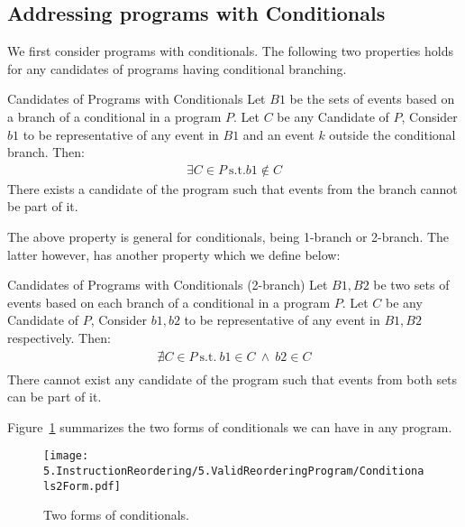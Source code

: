 \subsection{Addressing programs with Conditionals}

        We first consider programs with conditionals. 
        The following two properties holds for any candidates of programs having conditional branching. 
        \begin{property}{Candidates of Programs with Conditionals}
            \label{CondB1}
            Let $B1$ be the sets of events based on a branch of a conditional in a program $P$. Let $C$ be any Candidate of $P$, Consider $b1$ to be representative of any event in $B1$ and an event $k$ outside the conditional branch. Then:
            \begin{align*}
                \exists C \in P \ \text{s.t.} b1 \notin C  
            \end{align*}
            There exists a candidate of the program such that events from the branch cannot be part of it\footnotemark. 
        \end{property}

        The above property is general for conditionals, being 1-branch or 2-branch. 
        The latter however, has another property which we define below:
        \begin{property}{Candidates of Programs with Conditionals (2-branch)}
            \label{CondB2}
            Let $B1,B2$ be two sets of events based on each branch of a conditional in a program $P$. Let $C$ be any Candidate of $P$,  Consider $b1,b2$ to be representative of any event in $B1,B2$ respectively. Then:
            \begin{align*}
                \nexists C \in P \ \text{s.t.} \ b1 \in C \ \wedge \ b2 \in C \\ 
            \end{align*}
            There cannot exist any candidate of the program such that events from both sets can be part of it. 
        \end{property}

        Figure~\ref{reord:conditionals} summarizes the two forms of conditionals we can have in any program. 
        \begin{figure}[H]
            \centering 
            \texttt{[image: 5.InstructionReordering/5.ValidReorderingProgram/Conditionals2Form.pdf]}
            \caption{Two forms of conditionals.}
            \label{reord:conditionals}
        \end{figure}

